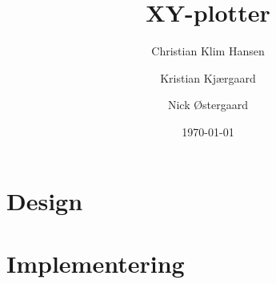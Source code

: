 \documentclass{../mypaper}
\title{XY-plotter}
\author{Christian Klim Hansen \and Kristian Kjærgaard \and Nick Østergaard}
\date{\today}
\begin{document}

\frontmatter

\tableofcontents



\mainmatter




\part{Design}





\part{Implementering}







\listoffigures

\listoftables

\listoffixmes
\end{document}
